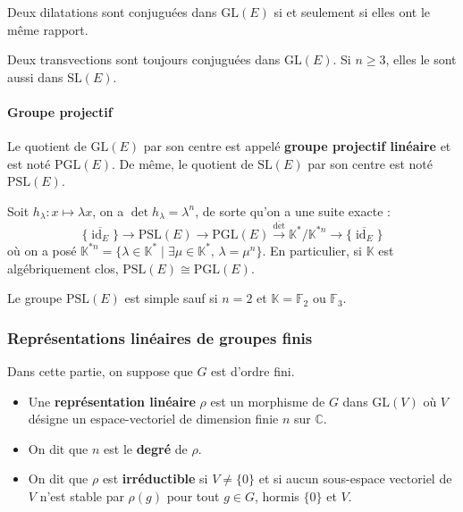	\begin{proposition}
		Deux dilatations sont conjuguées dans $\mathrm{GL}(E)$ si et seulement si elles ont le même rapport.
	\end{proposition}

	\begin{proposition}
		Deux transvections sont toujours conjuguées dans $\mathrm{GL}(E)$. Si $n \geq 3$, elles le sont aussi dans $\mathrm{SL}(E)$.
	\end{proposition}

	\paragraph{Groupe projectif}

	\begin{definition}
		Le quotient de $\mathrm{GL}(E)$ par son centre est appelé \textbf{groupe projectif linéaire} et est noté $\mathrm{PGL}(E)$. De même, le quotient de $\mathrm{SL}(E)$ par son centre est noté $\mathrm{PSL}(E)$.
	\end{definition}

	\begin{remark}
		Soit $h_\lambda : x \mapsto \lambda x$, on a $\det h_\lambda = \lambda^n$, de sorte qu'on a une suite exacte :
		\[ \{ \overline{\operatorname{id}_E} \} \rightarrow \mathrm{PSL}(E) \rightarrow \mathrm{PGL}(E) \xrightarrow{\overline{\det}} \mathbb{K}^*/\mathbb{K}^{*n} \rightarrow \{ \overline{\operatorname{id}_E} \} \]
		où on a posé $\mathbb{K}^{*n} = \{ \lambda \in \mathbb{K}^* \mid \exists \mu \in \mathbb{K}^*, \, \lambda = \mu^n \}$. En particulier, si $\mathbb{K}$ est algébriquement clos, $\mathrm{PSL}(E) \cong \mathrm{PGL}(E)$.
	\end{remark}

	\begin{theorem}
		Le groupe $\mathrm{PSL}(E)$ est simple sauf si $n = 2$ et $\mathbb{K} = \mathbb{F}_2$ ou $\mathbb{F}_3$.
	\end{theorem}

	\subsubsection{Représentations linéaires de groupes finis}


	Dans cette partie, on suppose que $G$ est d'ordre fini.

	\begin{definition}
		\begin{itemize}
			\item Une \textbf{représentation linéaire} $\rho$ est un morphisme de $G$ dans $\mathrm{GL}(V)$ où $V$ désigne un espace-vectoriel de dimension finie $n$ sur $\mathbb{C}$.
			\item On dit que $n$ est le \textbf{degré} de $\rho$.
			\item On dit que $\rho$ est \textbf{irréductible} si $V \neq \{ 0 \}$ et si aucun sous-espace vectoriel de $V$ n'est stable par $\rho(g)$ pour tout $g \in G$, hormis $\{ 0 \}$ et $V$.
		\end{itemize}
	\end{definition}

